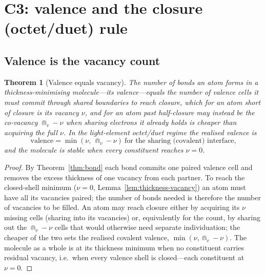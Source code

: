 \documentclass[11pt,twocolumn,a4paper]{article}
\theoremstyle{thmstyle}
\newtheorem{theorem}{Theorem}[section]
\theoremstyle{definition}
\theoremstyle{remark}
\newcommand{\vac}{\nu}                 %
\begin{document}
\section{C3: valence and the closure (octet/duet) rule}
\label{sec:valence}

\subsection{Valence is the vacancy count}

\begin{theorem}[Valence equals vacancy]
\label{thm:valence}
The number of bonds an atom forms in a thickness-minimising molecule---its
\emph{valence}---equals the number of valence cells it must commit through
shared boundaries to reach closure, which for an atom short of closure is
its vacancy $\vac$, and for an atom past half-closure may instead be the
co-vacancy $\Cap_v-\vac$ when sharing electrons it already holds is
cheaper than acquiring the full $\vac$. In the light-element octet/duet
regime the realised valence is
\[
\mathrm{valence}=\min(\vac,\ \Cap_v-\vac)\ \text{for the sharing
(covalent) interface,}
\]
and the molecule is stable when every constituent reaches $\vac=0$.
\end{theorem}

\begin{proof}
By Theorem~\ref{thm:bond} each bond commits one paired valence cell and
removes the excess thickness of one vacancy from each partner. To reach
the closed-shell minimum ($\vac=0$, Lemma~\ref{lem:thickness-vacancy})
an atom must have all its vacancies paired; the number of bonds needed is
therefore the number of vacancies to be filled. An atom may reach closure
either by acquiring its $\vac$ missing cells (sharing into its vacancies)
or, equivalently for the count, by sharing out the $\Cap_v-\vac$ cells
that would otherwise need separate individuation; the cheaper of the two
sets the realised covalent valence, $\min(\vac,\Cap_v-\vac)$. The molecule
as a whole is at its thickness minimum when no constituent carries
residual vacancy, i.e.\ when every valence shell is closed---each
constituent at $\vac=0$.
\end{proof}
\end{document}
